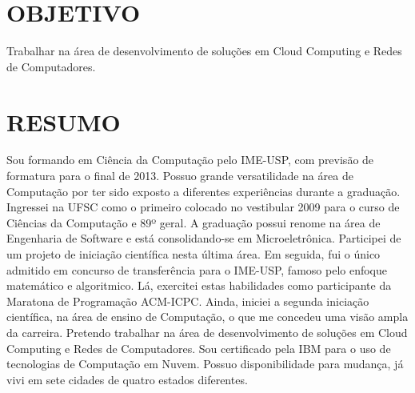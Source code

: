 \documentclass[margin=<value>,11pt]{res} %
\begin{document}

\address{R. Indiana, 998 -- São Paulo, SP 04562-001\\
        (11) 97132-1145, (11) 2389-7150 \\ \texttt{pedro@vezza.com.br}}

\begin{resume}
 
\section{OBJETIVO}  
     Trabalhar na área de desenvolvimento de soluções em Cloud Computing e Redes de Computadores.
 
\section{RESUMO}
Sou formando em Ciência da Computação pelo IME-USP, com previsão de formatura para o final de 2013. Possuo grande versatilidade na área de Computação por ter sido exposto a diferentes experiências durante a graduação. Ingressei na UFSC como o primeiro colocado no vestibular 2009 para o curso de Ciências da Computação e 89º geral. A graduação possui renome na área de Engenharia de Software e está consolidando-se em Microeletrônica. Participei de um projeto de iniciação científica nesta última área. Em seguida, fui o único admitido em concurso de transferência para o IME-USP, famoso pelo enfoque matemático e algoritmico. Lá, exercitei estas habilidades como participante da Maratona de Programação ACM-ICPC. Ainda, iniciei a segunda iniciação científica, na área de ensino de Computação, o que me concedeu uma visão ampla da carreira. Pretendo trabalhar na área de desenvolvimento de soluções em Cloud Computing e Redes de Computadores. Sou certificado pela IBM para o uso de tecnologias de Computação em Nuvem. Possuo disponibilidade para mudança, já vivi em sete cidades de quatro estados diferentes.



\end{resume}
\end{document}
